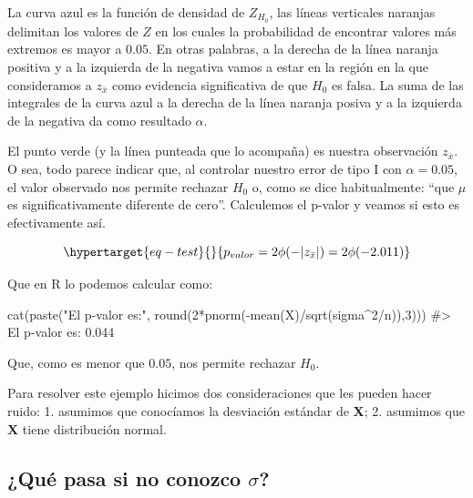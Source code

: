 \documentclass[
  letterpaper,
  DIV=11,
  numbers=noendperiod,
  oneside]{scrreprt}
\newenvironment{Shaded}{\begin{snugshade}}{\end{snugshade}}
\newcommand{\CommentTok}[1]{\textcolor[rgb]{0.37,0.37,0.37}{#1}}
\newcommand{\DecValTok}[1]{\textcolor[rgb]{0.68,0.00,0.00}{#1}}
\newcommand{\FunctionTok}[1]{\textcolor[rgb]{0.28,0.35,0.67}{#1}}
\newcommand{\NormalTok}[1]{\textcolor[rgb]{0.00,0.23,0.31}{#1}}
\newcommand{\SpecialCharTok}[1]{\textcolor[rgb]{0.37,0.37,0.37}{#1}}
\newcommand{\StringTok}[1]{\textcolor[rgb]{0.13,0.47,0.30}{#1}}
\begin{document}
La curva azul es la función de densidad de \(Z_{H_0}\), las líneas
verticales naranjas delimitan los valores de \(Z\) en los cuales la
probabilidad de encontrar valores más extremos es mayor a \(0.05\). En
otras palabras, a la derecha de la línea naranja positiva y a la
izquierda de la negativa vamos a estar en la región en la que
consideramos a \(z_{\bar{x}}\) como evidencia significativa de que
\(H_0\) es falsa. La suma de las integrales de la curva azul a la
derecha de la línea naranja posiva y a la izquierda de la negativa da
como resultado \(\alpha\).

El punto verde (y la línea punteada que lo acompaña) es nuestra
observación \(z_{\bar{x}}\). O sea, todo parece indicar que, al
controlar nuestro error de tipo I con \(\alpha=0.05\), el valor
observado nos permite rechazar \(H_0\) o, como se dice habitualmente:
``que \(\mu\) es significativamente diferente de cero''. Calculemos el
p-valor y veamos si esto es efectivamente así.

\begin{equation}\protect\hypertarget{eq-test}{}{
p_{valor} = 2 \phi(-|z_{\bar{x}}|) = 2 \phi(-2.011)
}\label{eq-test}\end{equation}

Que en R lo podemos calcular como:

\begin{Shaded}
\begin{Highlighting}[]
\FunctionTok{cat}\NormalTok{(}\FunctionTok{paste}\NormalTok{(}\StringTok{"El p{-}valor es:"}\NormalTok{, }\FunctionTok{round}\NormalTok{(}\DecValTok{2}\SpecialCharTok{*}\FunctionTok{pnorm}\NormalTok{(}\SpecialCharTok{{-}}\FunctionTok{mean}\NormalTok{(X)}\SpecialCharTok{/}\FunctionTok{sqrt}\NormalTok{(sigma}\SpecialCharTok{\^{}}\DecValTok{2}\SpecialCharTok{/}\NormalTok{n)),}\DecValTok{3}\NormalTok{)))}
\CommentTok{\#\textgreater{} El p{-}valor es: 0.044}
\end{Highlighting}
\end{Shaded}

Que, como es menor que \(0.05\), nos permite rechazar \(H_0\).

Para resolver este ejemplo hicimos dos consideraciones que les pueden
hacer ruido: 1. asumimos que conocíamos la desviación estándar de
\textbf{X}; 2. asumimos que \textbf{X} tiene distribución normal.

\hypertarget{quuxe9-pasa-si-no-conozco-sigma}{%
\subsection{\texorpdfstring{¿Qué pasa si no conozco
\(\sigma\)?}{¿Qué pasa si no conozco \textbackslash sigma?}}\label{quuxe9-pasa-si-no-conozco-sigma}}
\end{document}
